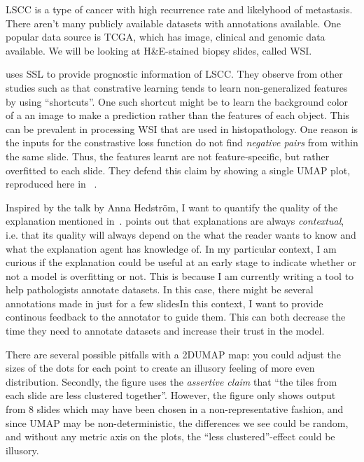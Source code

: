 \documentclass[10pt,twocolumn,letterpaper]{article}
\begin{document}
\gls{LSCC} is a type of cancer with high recurrence rate and likelyhood of metastasis. There aren't many publicly available datasets with annotations available. One popular data source is \gls{TCGA}, which has image, clinical and genomic data available. We will be looking at H\&E-stained biopsy slides, called \gls{WSI}.

\cite{sslUMAP} uses \gls{SSL} to provide prognostic information of \gls{LSCC}. They observe from other studies such as \cite{contrastiveShortcut} that constrative learning tends to learn non-generalized features by using ``shortcuts''. One such shortcut might be to learn the background color of a an image to make a prediction rather than the features of each object. This can be prevalent in processing \gls{WSI} that are used in histopathology. One reason is the inputs for the constrastive loss function do not find \textit{negative pairs} from within the same slide. Thus, the features learnt are not feature-specific, but rather overfitted to each slide. They defend this claim by showing a single \gls{UMAP} plot, reproduced here in ~.

Inspired by the talk by Anna Hedstr\"{o}m, I want to quantify the quality of the explanation mentioned in~\cite{sslUMAP}. \cite{miller} points out that explanations are always \textit{contextual}, i.e. that its quality will always depend on the what the reader wants to know and what the explanation agent has knowledge of. In my particular context, I am curious if the explanation could be useful at an early stage to indicate whether or not a model is overfitting or not. This is because I am currently writing a tool to help pathologists annotate datasets. In this case, there might be several annotations made in just for a few slidesIn this context, I want to provide continous feedback to the annotator to guide them. This can both decrease the time they need to annotate datasets and increase their trust in the model.

There are several possible pitfalls with a 2D\gls{UMAP} map: you could adjust the sizes of the dots for each point to create an illusory feeling of more even distribution. Secondly, the figure uses the \textit{assertive claim} that ``the tiles from each slide are less clustered together''. However, the figure only shows output from 8 slides which may have been chosen in a non-representative fashion, and since \gls{UMAP} may be non-deterministic, the differences we see could be random, and without any metric axis on the plots, the ``less clustered''-effect could be illusory.
\end{document}
